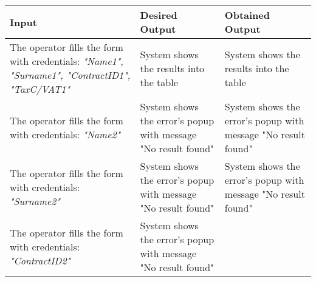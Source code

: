 {{{			\begin{table}[h]
			\begin{tabular}{|p{4cm}|p{5cm}|p{5cm}|}
			\hline
			\centering \vspace{1mm} \bfseries{Input} \vspace{1mm} & \vspace{1mm} \bfseries{Desired Output} \vspace{1mm} & \vspace{1mm} \bfseries{Obtained Output} \vspace{1mm}\\
			\hline
				\vspace{1mm} The operator fills the form with credentials: \itshape{"Name1", "Surname1", "ContractID1", "TaxC/VAT1"} \vspace{1mm} &
				\vspace{1mm} System shows the results into the table \vspace{1mm} & 
				\vspace{1mm} System shows the results into the table \vspace{1mm} \\
			\hline
				\vspace{1mm} The operator fills the form with credentials: \itshape{"Name2"} \vspace{1mm} &
				\vspace{1mm} System shows the error's popup with message "No result found" \vspace{1mm} & 
				\vspace{1mm} System shows the error's popup with message "No result found" \vspace{1mm} \\
			\hline
				\vspace{1mm} The operator fills the form with credentials: \itshape{"Surname2"} \vspace{1mm} &
				\vspace{1mm} System shows the error's popup with message "No result found" \vspace{1mm} & 
				\vspace{1mm} System shows the error's popup with message "No result found" \vspace{1mm} \\
			\hline
				\vspace{1mm} The operator fills the form with credentials: \itshape{"ContractID2"} \vspace{1mm} &
				\vspace{1mm} System shows the error's popup with message "No result found" \vspace{1mm} & 

\end{tabular}
\end{table}}}}
